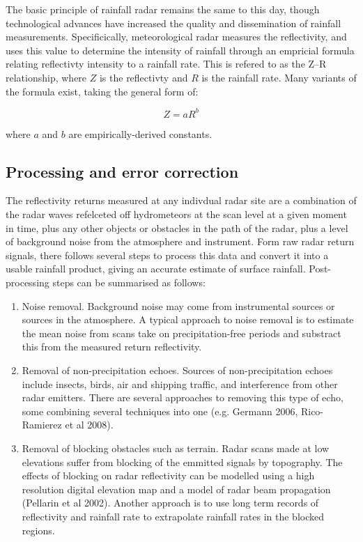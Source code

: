 The basic principle of rainfall radar remains the same to this day, though technological advances have increased the quality and dissemination of rainfall measurements. Specificically, meteorological radar measures the reflectivity, and uses this value to determine the intensity of rainfall through an empricial formula relating reflectivty intensity to a rainfall rate. This is refered to as the Z--R relationship, where \(Z\) is the reflectivty and \(R\) is the rainfall rate. Many variants of the formula exist, taking the general form of:
  
\begin{equation}
Z = aR^b
\end{equation}

where \(a\) and \(b\) are empirically-derived constants. 

\subsection{Processing and error correction}

The reflectivity returns measured at any indivdual radar site are a combination of the radar waves refelceted off hydrometeors at the scan level at a given moment in time, plus any other objects or obstacles in the path of the radar, plus a level of background noise from the atmosphere and instrument. Form raw radar return signals, there follows several steps to process this data and convert it into a usable rainfall product, giving an accurate estimate of surface rainfall. Post-processing steps can be summarised as follows:

\begin{enumerate}
\item Noise removal. Background noise may come from instrumental sources or sources in the atmosphere. A typical approach to noise removal is to estimate the mean noise from scans take on precipitation-free periods and substract this from the measured return reflectivity.

\item Removal of non-precipitation echoes. Sources of non-precipitation echoes include insects, birds, air and shipping traffic, and interference from other radar emitters. There are several approaches to removing this type of echo, some combining several techniques into one (e.g. Germann 2006, Rico-Ramierez et al 2008).

\item Removal of blocking obstacles such as terrain. Radar scans made at low elevations suffer from blocking of the emmitted signals by topography. The effects of blocking on radar reflectivity can be modelled using a high resolution digital elevation map and a model of radar beam propagation (Pellarin et al 2002). Another approach is to use long term records of reflectivity and rainfall rate to extrapolate rainfall rates in the blocked regions.

\end{enumerate}



